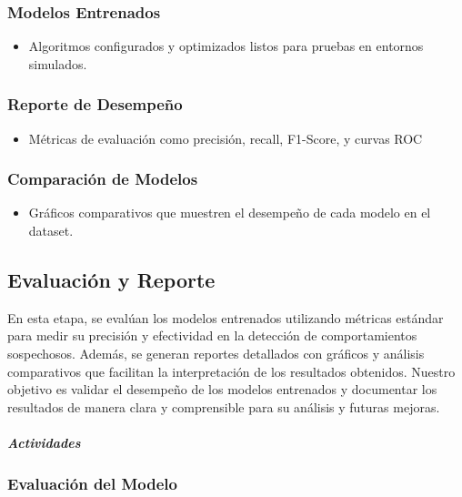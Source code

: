 \subsubsection{Modelos Entrenados}
\begin{itemize}
    \item Algoritmos configurados y optimizados listos para pruebas en entornos simulados.
\end{itemize}


\subsubsection{Reporte de Desempeño}
\begin{itemize}
    \item Métricas de evaluación como precisión, recall, F1-Score, y curvas ROC
\end{itemize}


\subsubsection{Comparación de Modelos}
\begin{itemize}
    \item Gráficos comparativos que muestren el desempeño de cada modelo en el dataset.
\end{itemize}


\subsection{Evaluación y Reporte}
En esta etapa, se evalúan los modelos entrenados utilizando métricas estándar para medir su precisión y efectividad en la detección de comportamientos sospechosos. Además, se generan reportes detallados con gráficos y análisis comparativos que facilitan la interpretación de los resultados obtenidos.
Nuestro objetivo es validar el desempeño de los modelos entrenados y documentar los resultados de manera clara y comprensible para su análisis y futuras mejoras.



\paragraph{\textit{Actividades}}

\subsubsection{Evaluación del Modelo}

